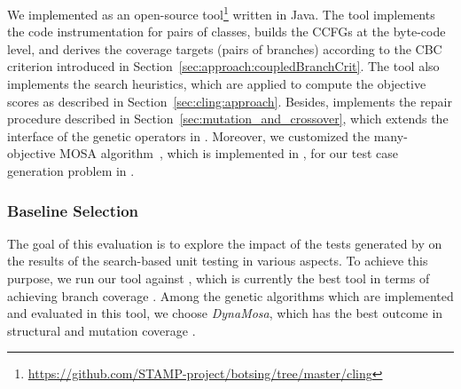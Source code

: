 We implemented \cling as an open-source tool\footnote{\url{https://github.com/STAMP-project/botsing/tree/master/cling}} written in Java. The tool implements the code instrumentation for pairs of classes, builds the CCFGs at the byte-code level, and derives the coverage targets (pairs of branches) according to the CBC criterion introduced in Section~\ref{sec:approach:coupledBranchCrit}. The tool also implements the search heuristics, which are applied to compute the objective scores as described in Section~\ref{sec:cling:approach}. 
 Besides, \cling implements the repair procedure described in Section~\ref{sec:mutation_and_crossover}, which extends the interface of the genetic operators in \evosuite. 
 Moreover, we customized the many-objective MOSA algorithm~\cite{Panichella2018}, which is implemented in \evosuite, for our test case generation problem in \cling.


%

\subsubsection{Baseline Selection}

The goal of this evaluation is to explore the impact of the tests generated by \integration on the results of the search-based unit testing in various aspects. To achieve this purpose, we run our tool against \evosuite, which is currently the best tool in terms of achieving branch coverage \cite{rueda2016unit, panichella2017java, molina2018java, kifetew2019java}. Among the genetic algorithms which are implemented and evaluated in this tool, we choose \emph{DynaMosa}, which has the best outcome in structural and mutation coverage \cite{Panichella2018}. 

